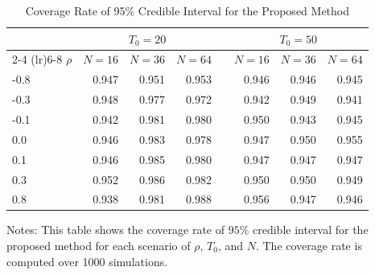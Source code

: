 \begin{table}[H]
\centering
\caption{Coverage Rate of 95\% Credible Interval for the Proposed Method}
\label{5.2 Simulation coverage rate}
\begin{tabular}{lrrrrrrr}
\hline
       & \multicolumn{3}{c}{$T_{0}=20$} & & \multicolumn{3}{c}{$T_{0}=50$}  \\ 
\cmidrule(lr){2-4} \cmidrule(lr){6-8}
$\rho$ & $N=16$   & $N=36$   & $N=64$ &   & $N=16$   & $N=36$   & $N=64$   \\ \hline
-0.8 & 0.947 & 0.951 & 0.953 & & 0.946 & 0.946 & 0.945 \\
-0.3 & 0.948 & 0.977 & 0.972 & & 0.942 & 0.949 & 0.941 \\
-0.1 & 0.942 & 0.981 & 0.980 & & 0.950 & 0.943 & 0.945 \\
 0.0 & 0.946 & 0.983 & 0.978 & & 0.947 & 0.950 & 0.955 \\
 0.1 & 0.946 & 0.985 & 0.980 & & 0.947 & 0.947 & 0.947 \\
 0.3 & 0.952 & 0.986 & 0.982 & & 0.950 & 0.950 & 0.949 \\
 0.8 & 0.938 & 0.981 & 0.988 & & 0.956 & 0.947 & 0.946 \\
\hline
\end{tabular}
\begin{tablenotes}
{\footnotesize
\item Notes: This table shows the coverage rate of $95$\% credible interval for the proposed method for each scenario of $\rho$, $T_0$, and  $N$. The coverage rate is computed over 1000 simulations.
}
\end{tablenotes}
\end{table}
